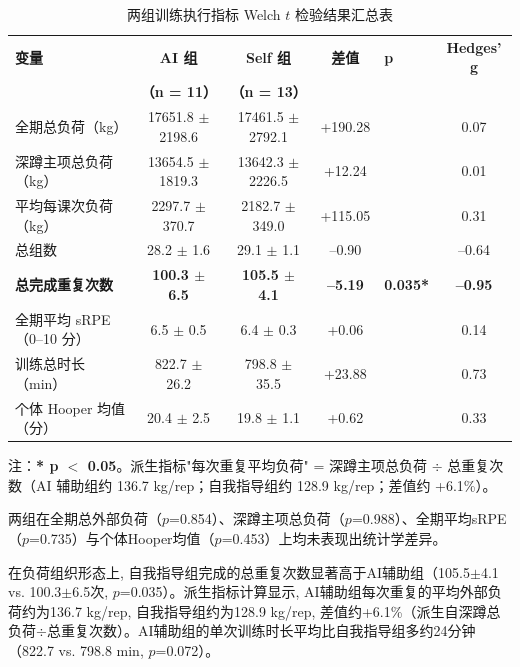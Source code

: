 \begin{table}[htbp]
\centering
\caption{两组训练执行指标 Welch $t$ 检验结果汇总表}
\label{tab:training_execution}
\begin{threeparttable}
\begin{tabular}{p{3.2cm}ccc>{\raggedleft\arraybackslash}p{1.3cm}c}
\toprule
\textbf{变量} & \textbf{AI 组} & \textbf{Self 组} & \textbf{差值} & \textbf{p} & \textbf{Hedges' g} \\
 & \textbf{（n = 11）} & \textbf{（n = 13）} & & & \\
\midrule
全期总负荷（kg）             & 17651.8 $\pm$ 2198.6 & 17461.5 $\pm$ 2792.1 & +190.28 & 0.854 & 0.07 \\
深蹲主项总负荷（kg）         & 13654.5 $\pm$ 1819.3 & 13642.3 $\pm$ 2226.5 & +12.24  & 0.988 & 0.01 \\
平均每课次负荷（kg）         & 2297.7 $\pm$ 370.7   & 2182.7 $\pm$ 349.0   & +115.05 & 0.445 & 0.31 \\
总组数                       & 28.2 $\pm$ 1.6       & 29.1 $\pm$ 1.1       & --0.90  & 0.136 & --0.64 \\
\textbf{总完成重复次数}       & \textbf{100.3 $\pm$ 6.5} & \textbf{105.5 $\pm$ 4.1} & \textbf{--5.19} & \textbf{0.035*} & \textbf{--0.95} \\
全期平均 sRPE（0--10 分）    & 6.5 $\pm$ 0.5        & 6.4 $\pm$ 0.3        & +0.06   & 0.735 & 0.14 \\
训练总时长（min）            & 822.7 $\pm$ 26.2     & 798.8 $\pm$ 35.5     & +23.88  & 0.072 & 0.73 \\
个体 Hooper 均值（分）       & 20.4 $\pm$ 2.5       & 19.8 $\pm$ 1.1       & +0.62   & 0.453 & 0.33 \\
\bottomrule
\end{tabular}
\begin{tablenotes}[flushleft]\footnotesize
\item 注：\textbf{* p $<$ 0.05}。派生指标"每次重复平均负荷" = 深蹲主项总负荷 $\div$ 总重复次数（AI 辅助组约 136.7 kg/rep；自我指导组约 128.9 kg/rep；差值约 +6.1\%）。
\end{tablenotes}
\end{threeparttable}
\end{table}

两组在全期总外部负荷（$p$=0.854）、深蹲主项总负荷（$p$=0.988）、全期平均sRPE（$p$=0.735）与个体Hooper均值（$p$=0.453）上均未表现出统计学差异。

在负荷组织形态上, 自我指导组完成的总重复次数显著高于AI辅助组（105.5$\pm$4.1 vs. 100.3$\pm$6.5次, $p$=0.035）。派生指标计算显示, AI辅助组每次重复的平均外部负荷约为136.7 kg/rep, 自我指导组约为128.9 kg/rep, 差值约+6.1\%（派生自深蹲总负荷$\div$总重复次数）。AI辅助组的单次训练时长平均比自我指导组多约24分钟（822.7 vs. 798.8 min, $p$=0.072）。

